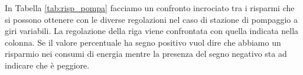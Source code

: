 \documentclass[laurea,oneside,11pt]{USiena_tesiLM}
\begin{document}
\begin{table}[!ht]
\centering
{}
\caption{Risparmi di energia ottenuti utilizzando una pompa a giri variabili rispetto ad una pompa a giri fissi }
\label{tab:consumi_pompa}
\end{table}


In Tabella \ref{tab:risp_pompa} facciamo un confronto incrociato tra i risparmi che si possono ottenere con le diverse regolazioni nel caso di stazione di pompaggio a giri variabili.
La regolazione della riga viene confrontata con quella indicata nella colonna. Se il valore percentuale ha segno positivo vuol dire che abbiamo un risparmio nei consumi di energia mentre la presenza del segno negativo sta ad indicare che è peggiore.
\end{document}
